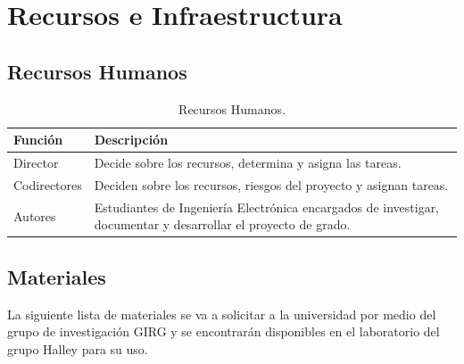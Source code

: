 \documentclass[12pt,a4paper,oneside]{book}
\begin{document}
\newpage 
\chapter{Recursos e Infraestructura}
\section{\textbf{Recursos Humanos}}

\begin{table}[htbp]
\begin{center}
\begin{tabular}{|p{2cm}|p{7cm}|}\hline
\hline
Función & Descripción \\
\hline    \hline
Director  & Decide sobre los recursos, determina y asigna las tareas. \\ \hline
Codirectores  & Deciden sobre los recursos, riesgos del proyecto y asignan tareas.  \\ \hline
Autores  & Estudiantes de Ingeniería Electrónica encargados de investigar, documentar y desarrollar el proyecto de grado.  \\ \hline
\end{tabular}
\caption{Recursos Humanos.}
\label{Tabla: Recursos Humanos}
\end{center}
\end{table}
 
\section{\textbf{Materiales}}
La siguiente lista de materiales se va a solicitar a la universidad por medio del grupo de investigación GIRG y se encontrarán disponibles en el laboratorio del grupo Halley para su uso.\\\\
\end{document}
